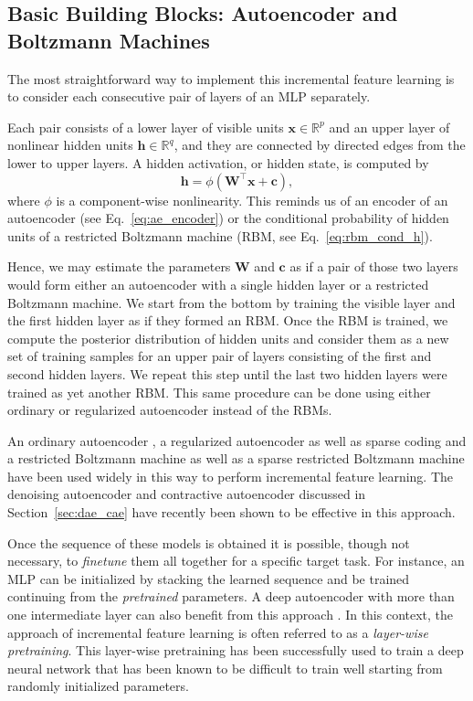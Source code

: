 \documentclass[dissertation,nocontribution]{aaltoseries}
\newcommand{\vect}[1]{\mathbf{#1}}
\newcommand{\matr}[1]{\mathbf{#1}}
\newcommand{\vc}[0]{\vect{c}}
\newcommand{\vh}[0]{\vect{h}}
\newcommand{\vx}[0]{\vect{x}}
\newcommand{\mW}[0]{\matr{W}}
\newcommand{\RR}[0]{\mathbb{R}}
\begin{document}
\subsection{Basic Building Blocks: Autoencoder and Boltzmann
Machines}
\label{sec:basic_blocks1}

The most straightforward way to implement this incremental
feature learning is to consider each consecutive pair of
layers of an MLP separately. 

Each pair consists of a lower layer of visible units $\vx
\in \RR^p$ and an upper layer of nonlinear hidden units $\vh
\in \RR^q$, and they are connected by directed edges from
the lower to upper layers. A hidden activation, or hidden
state, is computed by 
\[
\vh = \phi\left( \mW^\top \vx + \vc \right),
\]
where $\phi$ is a component-wise nonlinearity.  This reminds
us of an encoder of an autoencoder (see
Eq.~\eqref{eq:ae_encoder}) or the conditional probability of
hidden units of a restricted Boltzmann machine (RBM, see
Eq.~\eqref{eq:rbm_cond_h}).

Hence, 
we may estimate the parameters $\mW$ and
$\vc$ as if a pair of those two layers would form either an
autoencoder with a single hidden layer or a restricted
Boltzmann machine. We start from the bottom by training the
visible layer and the first hidden layer as if they formed
an RBM. Once the RBM is trained, we compute the posterior
distribution of hidden units and consider them as a new set
of training samples for an upper pair of layers consisting
of the first and second hidden layers. We repeat this step
until the last two hidden layers were trained as yet
another RBM. This same procedure can be done using
either ordinary or regularized autoencoder instead of the
RBMs.

An ordinary autoencoder \citep[see, e.g.,][and
Section~\ref{sec:autoencoders}]{Bengio2007nips}, a
regularized autoencoder \citep[see, e.g.,][and
Section~\ref{sec:spaenc}]{Ranzato2008} as
well as sparse coding \citep[see, e.g.,][and
Section~\ref{sec:sparse_coding}]{Raina2007} and a restricted
Boltzmann machine \citep[see, e.g.,][and
Section~\ref{sec:rbm}]{Hinton2006} as well as a sparse
restricted Boltzmann machine \citep[see, e.g.,][]{Lee2007}
have been used widely in this way to perform incremental
feature learning. The denoising autoencoder
\citep{Vincent2010} and contractive autoencoder
\citep{Rifai2011} discussed in Section~\ref{sec:dae_cae}
have recently been shown to be effective in this approach.

Once the sequence of these models is obtained it is
possible, though not necessary, to \textit{finetune} them
all together for a specific target task. For instance, an
MLP can be initialized by stacking the learned sequence and
be trained continuing from the \textit{pretrained}
parameters.
A deep autoencoder with more
than one intermediate layer can also benefit from this
approach \citep{Hinton2006}. In this context, the approach
of incremental feature learning is often referred to as a
\textit{layer-wise pretraining}. This layer-wise pretraining
has been successfully used to train a deep neural network
that has been known to be difficult to train well
starting from randomly initialized parameters.
\end{document}
